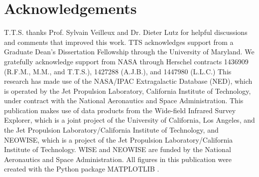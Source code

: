 \documentclass[fleqn, usenatbib]{mnras}
\begin{document}
\section*{Acknowledgements}
T.T.S. thanks Prof. Sylvain Veilleux and Dr. Dieter Lutz for helpful discussions and comments that improved this work. TTS acknowledges support from a Graduate Dean's Dissertation Fellowship through the University of Maryland. We gratefully acknowledge support from NASA through Herschel contracts 1436909 (R.F.M., M.M., and T.T.S.), 1427288 (A.J.B.), and 1447980 (L.L.C.) This research has made use of the NASA/IPAC Extragalactic Database (NED), which is operated by the Jet Propulsion Laboratory, California Institute of Technology, under contract with the National Aeronautics and Space Administration. This publication makes use of data products from the Wide-field Infrared Survey Explorer, which is a joint project of the University of California, Los Angeles, and the Jet Propulsion Laboratory/California Institute of Technology, and NEOWISE, which is a project of the Jet Propulsion Laboratory/California Institute of Technology. WISE and NEOWISE are funded by the National Aeronautics and Space Administration. All figures in this publication were created with the Python package \textsc{MATPLOTLIB} \citep{Hunter:2007}. 






\appendix
\end{document}
